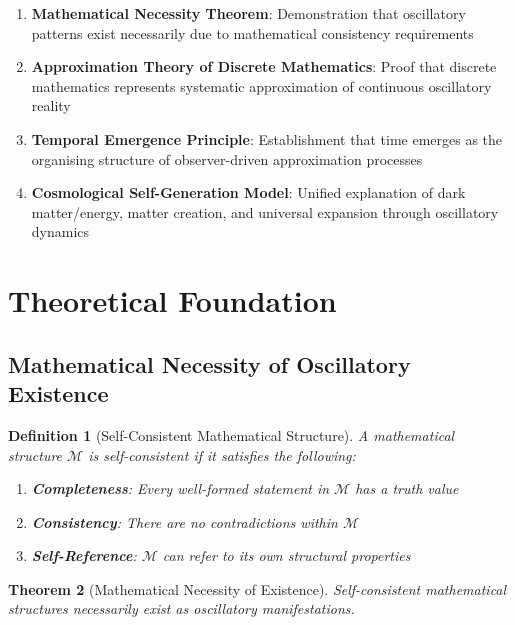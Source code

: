 \documentclass[11pt]{article}
\newtheorem{theorem}{Theorem}[section]
\newtheorem{definition}[theorem]{Definition}
\theoremstyle{remark}
\begin{document}
\begin{enumerate}
\item \textbf{Mathematical Necessity Theorem}: Demonstration that oscillatory patterns exist necessarily due to mathematical consistency requirements
\item \textbf{Approximation Theory of Discrete Mathematics}: Proof that discrete mathematics represents systematic approximation of continuous oscillatory reality
\item \textbf{Temporal Emergence Principle}: Establishment that time emerges as the organising structure of observer-driven approximation processes
\item \textbf{Cosmological Self-Generation Model}: Unified explanation of dark matter/energy, matter creation, and universal expansion through oscillatory dynamics
\end{enumerate}

\section{Theoretical Foundation}

\subsection{Mathematical Necessity of Oscillatory Existence}

\begin{definition}[Self-Consistent Mathematical Structure]
A mathematical structure $\mathcal{M}$ is self-consistent if it satisfies the following:
\begin{enumerate}
\item \textbf{Completeness}: Every well-formed statement in $\mathcal{M}$ has a truth value
\item \textbf{Consistency}: There are no contradictions within $\mathcal{M}$
\item \textbf{Self-Reference}: $\mathcal{M}$ can refer to its own structural properties
\end{enumerate}
\end{definition}

\begin{theorem}[Mathematical Necessity of Existence]
Self-consistent mathematical structures necessarily exist as oscillatory manifestations.
\end{theorem}
\end{document}
